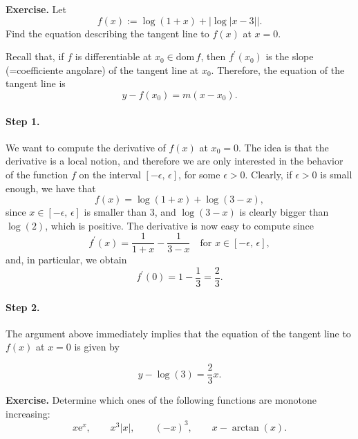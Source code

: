 \documentclass[a4paper,10 pt]{report}
\newcommand{\finalanswer}[1]{%
    \begin{finalAnswer}
    \[
        #1
    \]
    \end{finalAnswer}
}
\theoremstyle{definition}
\begin{document}
\begin{exerciseBox} \textbf{Exercise.} Let
\begin{equation*} f(x) := \log(1 + x) + \left| \log|x - 3| \right|. \end{equation*}
Find the equation describing the tangent line to $f(x)$ at $x = 0$.
\end{exerciseBox}

\begin{solutionBox} Recall that, if $f$ is differentiable at $x_0 \in \mathrm{dom} \, f$, then $f^\prime(x_0)$ is the slope (=coefficiente angolare) of the tangent line at $x_0$. Therefore, the equation of the tangent line is
\begin{equation*} y - f(x_0) = m(x - x_0). \end{equation*}

\paragraph{Step 1.} We want to compute the derivative of $f(x)$ at $x_0 = 0$. The idea is that the derivative is a local notion, and therefore we are only interested in the behavior of the function $f$ on the interval $[- \epsilon, \, \epsilon]$, for some $\epsilon > 0$. Clearly, if $\epsilon > 0$ is small enough, we have that
\begin{equation*} f(x) = \log(1 + x) + \log(3 - x), \end{equation*}
since $x \in [- \epsilon, \, \epsilon]$ is smaller than $3$, and $\log(3 - x)$ is clearly bigger than $\log(2)$, which is positive. The derivative is now easy to compute since
\begin{equation*} f^\prime(x) = \frac{1}{1 + x} - \frac{1}{3 - x} \quad \text{for  $x \in [- \epsilon, \, \epsilon]$}, \end{equation*}
and, in particular, we obtain
\begin{equation*} f^\prime(0) = 1 - \frac{1}{3} = \frac{2}{3}. \end{equation*}

\paragraph{Step 2.} The argument above immediately implies that the equation of the tangent line to $f(x)$ at $x = 0$ is given by
\finalanswer{
y - \log(3) = \frac{2}{3} x.
} \end{solutionBox}

\begin{exerciseBox} \textbf{Exercise.} Determine which ones of the following functions are monotone increasing:
\begin{equation*} x \mathrm{e}^x, \qquad x^3|x|, \qquad (-x)^3, \qquad  x - \arctan(x). \end{equation*}
\end{exerciseBox}
\end{document}
